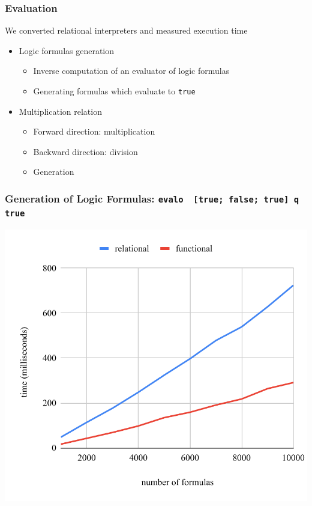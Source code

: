 \documentclass[xcolor=table]{beamer}
\begin{document}
\begin{frame}[fragile]
  \frametitle{Evaluation}
  \begin{center}
    We converted relational interpreters and measured execution time
  \end{center}

  \begin{itemize}
    \item Logic formulas generation
    \begin{itemize}
      \item Inverse computation of an evaluator of logic formulas
      \item Generating formulas which evaluate to \lstinline{true}
    \end{itemize}
    \item Multiplication relation
    \begin{itemize}
      \item Forward direction: multiplication
      \item Backward direction: division
      \item Generation
    \end{itemize}
  \end{itemize}
\end{frame}

\begin{frame}[fragile]
  \frametitle{Generation of Logic Formulas: \lstinline[basicstyle=\Large]{evalo  [true; false; true] q true}}
  \begin{center}
    \includegraphics[height=0.85\textheight]{figures/propIOI.pdf}
  \end{center}
\end{frame}
\end{document}
